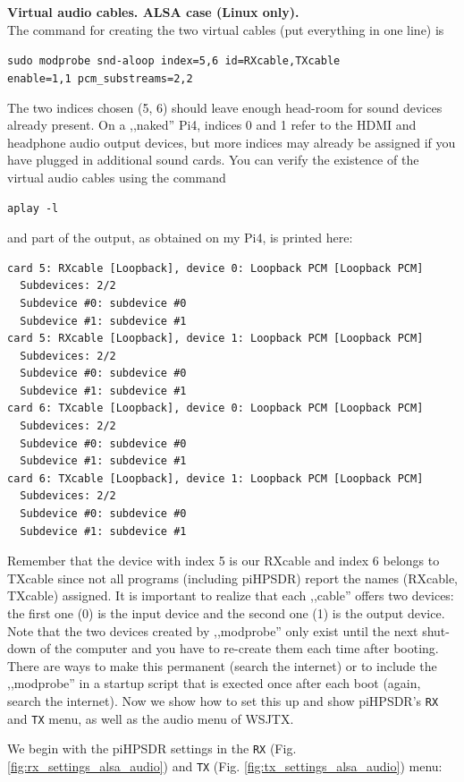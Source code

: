 \documentclass[12pt]{book}
\def\bltt#1{\texttt{\color{blue}#1}}
\begin{document}
\textbf{\color{red}Virtual audio cables. ALSA case (Linux only).} \\
The command for creating the two virtual cables (put everything in one line) is

\texttt{sudo modprobe snd-aloop index=5,6 id=RXcable,TXcable\\
enable=1,1 pcm\_substreams=2,2}

The two indices chosen (5, 6) should leave enough head-room for sound devices
already present. On a ,,naked'' Pi4, indices 0 and 1 refer to the HDMI
and headphone audio output devices, but more indices may already be assigned
if you have plugged in additional sound cards. You can verify the existence of
the virtual audio cables using the command

\texttt{aplay -l}

and part of the output, as obtained on my Pi4, is printed here:

\begin{small}
\begin{verbatim}
card 5: RXcable [Loopback], device 0: Loopback PCM [Loopback PCM]
  Subdevices: 2/2
  Subdevice #0: subdevice #0
  Subdevice #1: subdevice #1
card 5: RXcable [Loopback], device 1: Loopback PCM [Loopback PCM]
  Subdevices: 2/2
  Subdevice #0: subdevice #0
  Subdevice #1: subdevice #1
card 6: TXcable [Loopback], device 0: Loopback PCM [Loopback PCM]
  Subdevices: 2/2
  Subdevice #0: subdevice #0
  Subdevice #1: subdevice #1
card 6: TXcable [Loopback], device 1: Loopback PCM [Loopback PCM]
  Subdevices: 2/2
  Subdevice #0: subdevice #0
  Subdevice #1: subdevice #1
\end{verbatim}
\end{small}
Remember that the device with index 5 is our RXcable and index 6 belongs to TXcable since
not all programs (including piHPSDR) report the names (RXcable, TXcable) assigned. It is
important to realize that each ,,cable'' offers two devices: the first one (0) is
the input device and the second one (1) is the output device.
Note that
the two devices created by ,,modprobe'' only exist until the next shut-down of the computer and
you have to re-create them each time after booting. There are ways to make this permanent (search
the internet) or to include the ,,modprobe'' in a startup script that is exected once after each
boot (again, search the internet). Now we show how to set this up and show piHPSDR's \bltt{RX} and
\bltt{TX} menu, as well as the audio menu of WSJTX.

We begin with the piHPSDR settings in the \bltt{RX} (Fig. \ref{fig:rx_settings_alsa_audio}) and
\bltt{TX} (Fig. \ref{fig:tx_settings_alsa_audio}) menu:
\end{document}
